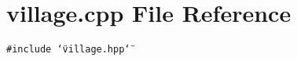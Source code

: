 \section{village.cpp File Reference}
\label{village_8cpp}
{\tt \#include \char`\"{}village.hpp\char`\"{}}\par
